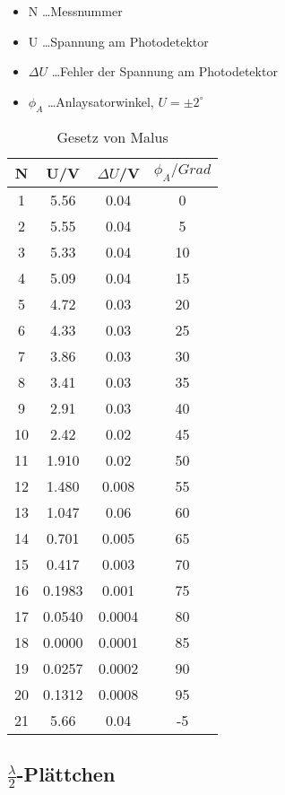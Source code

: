 \documentclass[a4paper]{article}
\begin{document}
\begin{table}[ht]
  \centering
  \caption{Gesetz von Malus}
  \begin{itemize}
    \item N \dots Messnummer
    \item U \dots Spannung am Photodetektor
    \item $\Delta U$ \dots Fehler der Spannung am Photodetektor
    \item $\phi_A$ \dots Anlaysatorwinkel, $U=\pm2^\circ$
  \end{itemize}
  \begin{tabular}{|c|c|c|c|}
    \hline
    N&U/V&$\Delta U$/V&$\phi_A/Grad$\\
    \hline
    1&5.56&0.04&0\\
    \hline
    2&5.55&0.04&5\\
    \hline
    3&5.33&0.04&10\\
    \hline
    4&5.09&0.04&15\\
    \hline
    5&4.72&0.03&20\\
    \hline
    6&4.33&0.03&25\\
    \hline
    7&3.86&0.03&30\\
    \hline
    8&3.41&0.03&35\\
    \hline
    9&2.91&0.03&40\\
    \hline
    10&2.42&0.02&45\\
    \hline
    11&1.910&0.02&50\\
    \hline
    12&1.480&0.008&55\\
    \hline
    13&1.047&0.06&60\\
    \hline
    14&0.701&0.005&65\\
    \hline
    15&0.417&0.003&70\\
    \hline
    16&0.1983&0.001&75\\
    \hline
    17&0.0540&0.0004&80\\
    \hline
    18&0.0000&0.0001&85\\
    \hline
    19&0.0257&0.0002&90\\
    \hline
    20&0.1312&0.0008&95\\
    \hline
    21&5.66&0.04&-5\\
    \hline
  \end{tabular}
  \label{tab:1}
\end{table}

\newpage
\subsection{$\frac{\lambda}{2}$-Plättchen}
\end{document}
